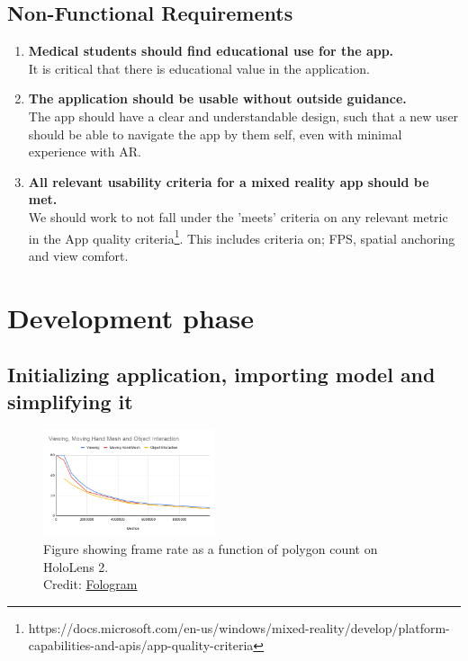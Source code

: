\subsection*{Non-Functional Requirements}

\begin{enumerate}
    \item {
        \textbf{Medical students should find educational use for the app.}\\
        It is critical that there is educational value in the application. 
    }
    \item {
        \textbf{The application should be usable without outside guidance.}\\
        The app should have a clear and understandable design, such that a new user should be able to navigate the app by them self, even with minimal experience with AR.
    }
    \item {
        \textbf{All relevant usability criteria for a mixed reality app should be met.}\\
We should work to not fall under the 'meets' criteria on any relevant metric in the App quality criteria\footnote{https://docs.microsoft.com/en-us/windows/mixed-reality/develop/platform-capabilities-and-apis/app-quality-criteria}. This includes criteria on; FPS, spatial anchoring and view comfort. 
    }
\end{enumerate}


\section{Development phase}

\subsection*{Initializing application, importing model and simplifying it}

\begin{figure} 
    \centering
    \includegraphics[width=0.45\textwidth]{fig/hololens2polycount}
    \caption{Figure showing frame rate as a function of polygon count on HoloLens 2. \\ Credit: \href{https://community.fologram.com/t/hololens-2-polygon-count-and-frame-rate/49}{Fologram}}
    \vspace{20pt}
    \label{fig:polycount}
\end{figure}

